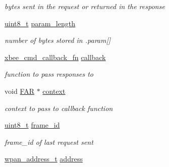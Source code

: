 \begin{DoxyCompactItemize}
\begin{DoxyCompactList}\small\item\em bytes sent in the request or returned in the response \end{DoxyCompactList}\item 
\hypertarget{structxbee__cmd__request__t_a2045e9bf1b048b408cc9fdc02271e494}{\hyperlink{group__hal_gae1affc9ca37cfb624959c866a73f83c2}{uint8\-\_\-t} \hyperlink{structxbee__cmd__request__t_a2045e9bf1b048b408cc9fdc02271e494}{param\-\_\-length}}\label{structxbee__cmd__request__t_a2045e9bf1b048b408cc9fdc02271e494}

\begin{DoxyCompactList}\small\item\em number of bytes stored in .param\mbox{[}\mbox{]} \end{DoxyCompactList}\item 
\hypertarget{structxbee__cmd__request__t_a5d0bf7245ec4d667898f583a0384efb3}{\hyperlink{group__xbee__atcmd_ga9c6cda2f2b7450e8ef2f6b32d9fdcb12}{xbee\-\_\-cmd\-\_\-callback\-\_\-fn} \hyperlink{structxbee__cmd__request__t_a5d0bf7245ec4d667898f583a0384efb3}{callback}}\label{structxbee__cmd__request__t_a5d0bf7245ec4d667898f583a0384efb3}

\begin{DoxyCompactList}\small\item\em function to pass responses to \end{DoxyCompactList}\item 
\hypertarget{structxbee__cmd__request__t_aa91f8e864e06077c354e5f5216547758}{void \hyperlink{group__hal_gaef060b3456fdcc093a7210a762d5f2ed}{F\-A\-R} $\ast$ \hyperlink{structxbee__cmd__request__t_aa91f8e864e06077c354e5f5216547758}{context}}\label{structxbee__cmd__request__t_aa91f8e864e06077c354e5f5216547758}

\begin{DoxyCompactList}\small\item\em context to pass to callback function \end{DoxyCompactList}\item 
\hypertarget{structxbee__cmd__request__t_a03c1016ac46b9df250b994f242cf956a}{\hyperlink{group__hal_gae1affc9ca37cfb624959c866a73f83c2}{uint8\-\_\-t} \hyperlink{structxbee__cmd__request__t_a03c1016ac46b9df250b994f242cf956a}{frame\-\_\-id}}\label{structxbee__cmd__request__t_a03c1016ac46b9df250b994f242cf956a}

\begin{DoxyCompactList}\small\item\em frame\-\_\-id of last request sent \end{DoxyCompactList}\item 
\hypertarget{structxbee__cmd__request__t_a66a58a737aee9733019399e2eceabf4a}{\hyperlink{structwpan__address__t}{wpan\-\_\-address\-\_\-t} \hyperlink{structxbee__cmd__request__t_a66a58a737aee9733019399e2eceabf4a}{address}}\label{structxbee__cmd__request__t_a66a58a737aee9733019399e2eceabf4a}


\end{DoxyCompactItemize}
